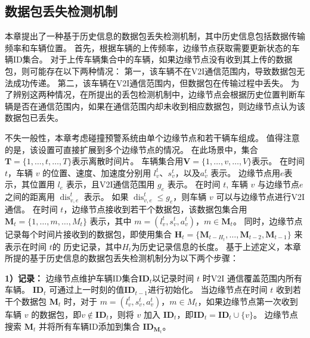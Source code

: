 \subsection{数据包丢失检测机制}

本章提出了一种基于历史信息的数据包丢失检测机制，其中历史信息包括数据传输频率和车辆位置。
首先，根据车辆的上传频率，边缘节点获取需要更新状态的车辆ID集合。
对于上传车辆集合中的车辆，如果边缘节点没有收到其上传的数据包，则可能存在以下两种情况：
第一，该车辆不在V2I通信范围内，导致数据包无法成功传递。
第二，该车辆在V2I通信范围内，但数据包在传输过程中丢失。
为了辨别这两种情况，在所提出的丢包检测机制中，边缘节点会根据历史位置判断车辆是否在通信范围内，如果在通信范围内却未收到相应数据包，则边缘节点认为该数据包已丢失。

不失一般性，本章考虑碰撞预警系统由单个边缘节点和若干辆车组成。
值得注意的是，该设置可直接扩展到多个边缘节点的情况。
在此场景中，集合$\mathbf{T}=\{1, \ldots, t, \ldots, T\}$表示离散时间片。
车辆集合用$\mathbf{V}=\{1, \ldots, v, \ldots, V\}$表示。
在时间 $t$，车辆 $v$ 的位置、速度、加速度分别用 $l_{v}^{t}$、$s_{v}^{t}$，以及$a_{v}^{t}$ 表示。
边缘节点用$e$表示，其位置用 ${l}_{e}$ 表示，且V2I通信范围用 $g_e$ 表示。
在时间 $t$, 车辆 $v$ 与边缘节点$e$之间的距离用 $\operatorname{dis}_{v, e}^{t}$ 表示。
如果 $\operatorname{dis}_{v, e}^{t} \leq g_e$，则车辆 ${v}$ 可以与边缘节点进行V2I通信。
在时间 $t$，边缘节点接收到若干个数据包，该数据包集合用 $\mathbf{M}_{t}=\{1, \ldots, m, \ldots, {M}_t\}$ 表示，其中 $m =(l_{v}^{t}, s_{v}^{t}, a_{v}^{t})$，$m \in \mathbf{M}_{t}$。
同时，边缘节点记录每个时间片接收到的数据包，即使用集合 ${\mathbf{H}_{t}} = \{\mathbf{M}_{t-{H}_{t}}, \ldots, \mathbf{M}_{t-2}, \mathbf{M}_{t-1}\}$ 来表示在时间 $t$的 历史记录，其中${H}_{t}$为历史记录信息的长度。
基于上述定义，本章所提的基于历史信息的数据包丢失检测机制分为以下两个步骤：

\textbf{1）记录：}
边缘节点维护车辆ID集合$\mathbf{ID}_{t}$以记录时间 $t$ 时V2I 通信覆盖范围内所有车辆。
$\mathbf{ID}_{t}$ 可通过上一时刻的值$\mathbf{ID}_{t-1}$进行初始化。 
当边缘节点在时间 $t$ 收到若干个数据包 $\mathbf{M}_{t}$ 时，对于 $m =(l_{v}^{t}, s_{v}^{t}, a_{v}^{t})$，${m} \in M_{t}$，如果边缘节点第一次收到车辆 $v$ 的数据包，即${v} \notin \mathbf{ID}_{t}$，则将 $v$ 加入 $\mathbf{ID}_{t}$，即$\mathbf{ID}_{t} = \mathbf{ID}_{t} \cup \{v\}$。
边缘节点搜索 $\mathbf{M}_{t}$ 并将所有车辆ID添加到集合 $\mathbf{ID}_{\mathbf{M}_{t}}$。

